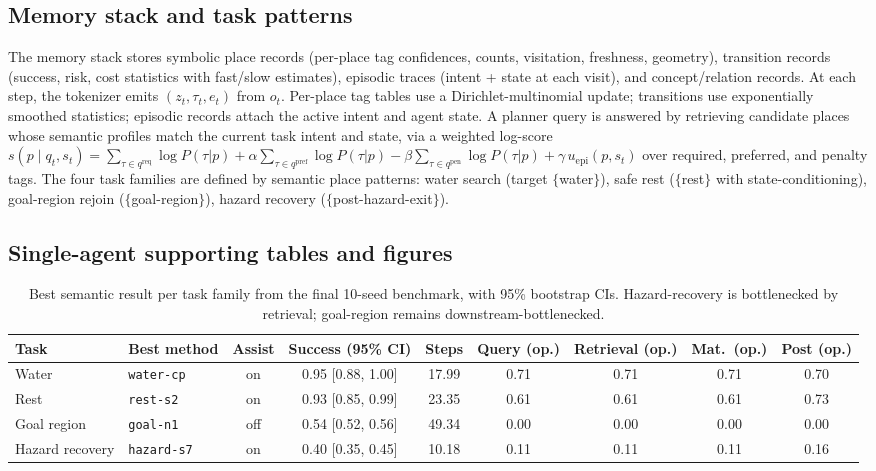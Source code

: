 \documentclass{article}
\newcommand{\method}[1]{\texttt{#1}}
\begin{document}
\subsection{Memory stack and task patterns}

The memory stack stores symbolic place records (per-place tag confidences, counts, visitation, freshness, geometry), transition records (success, risk, cost statistics with fast/slow estimates), episodic traces (intent + state at each visit), and concept/relation records. At each step, the tokenizer emits $(z_t, \tau_t, e_t)$ from $o_t$. Per-place tag tables use a Dirichlet-multinomial update; transitions use exponentially smoothed statistics; episodic records attach the active intent and agent state. A planner query is answered by retrieving candidate places whose semantic profiles match the current task intent and state, via a weighted log-score
$s(p \mid q_t, s_t) = \sum_{\tau \in q^{\mathrm{req}}} \log P(\tau|p)
+ \alpha \sum_{\tau \in q^{\mathrm{pref}}} \log P(\tau|p)
- \beta \sum_{\tau \in q^{\mathrm{pen}}} \log P(\tau|p)
+ \gamma\, u_{\mathrm{epi}}(p, s_t)$
over required, preferred, and penalty tags. The four task families are defined by semantic place patterns: water search (target $\{$water$\}$), safe rest ($\{$rest$\}$ with state-conditioning), goal-region rejoin ($\{$goal-region$\}$), hazard recovery ($\{$post-hazard-exit$\}$).

\subsection{Single-agent supporting tables and figures}
\label{app:single-results-table}

\begin{table}[!ht]
  \caption{Best semantic result per task family from the final 10-seed benchmark, with 95\% bootstrap CIs. Hazard-recovery is bottlenecked by retrieval; goal-region remains downstream-bottlenecked.}
  \label{tab:main-results}
  \centering
  \scriptsize
  \setlength{\tabcolsep}{3.5pt}
  \begin{tabular}{p{1.5cm}p{1.7cm}c c c c c c c}
    \toprule
    Task & Best method & Assist & Success (95\% CI) & Steps & Query (op.) & Retrieval (op.) & Mat.\ (op.) & Post (op.) \\
    \midrule
    Water & \method{water-cp} & on & 0.95 [0.88, 1.00] & 17.99 & 0.71 & 0.71 & 0.71 & 0.70 \\
    Rest & \method{rest-s2} & on & 0.93 [0.85, 0.99] & 23.35 & 0.61 & 0.61 & 0.61 & 0.73 \\
    Goal region & \method{goal-n1} & off & 0.54 [0.52, 0.56] & 49.34 & 0.00 & 0.00 & 0.00 & 0.00 \\
    Hazard recovery & \method{hazard-s7} & on & 0.40 [0.35, 0.45] & 10.18 & 0.11 & 0.11 & 0.11 & 0.16 \\
    \bottomrule
  \end{tabular}
\end{table}
\end{document}
